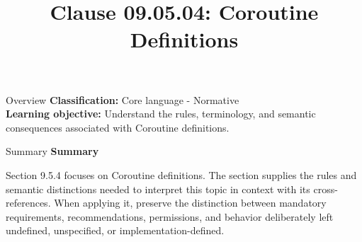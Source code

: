 \documentclass[10pt,letterpaper]{article}
\title{Clause 09.05.04: Coroutine Definitions}
\author{}
\date{}
\begin{document}
\maketitle
\begin{CornellOverviewBox}{Overview}
\textbf{Classification:} Core language - Normative\\[2pt]
\textbf{Learning objective:} Understand the rules, terminology, and semantic consequences associated with Coroutine definitions.
\end{CornellOverviewBox}\begin{CornellSummaryBox}{Summary}
{\sffamily\bfseries\color{Accent} Summary}\par\vspace{3pt}Section 9.5.4 focuses on Coroutine definitions. The section supplies the rules and semantic distinctions needed to interpret this topic in context with its cross-references. When applying it, preserve the distinction between mandatory requirements, recommendations, permissions, and behavior deliberately left undefined, unspecified, or implementation-defined.
\end{CornellSummaryBox}
\end{document}
